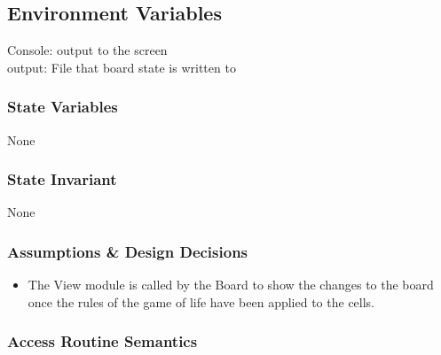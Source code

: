 \documentclass[12pt]{article}
\begin{document}
\subsection* {Environment Variables}

Console: output to the screen\\
output: File that board state is written to\\

\subsubsection* {State Variables}

None

\subsubsection* {State Invariant}

None

\subsubsection* {Assumptions \& Design Decisions}

\begin{itemize}
\item The View module is called by the Board to show the changes to the board once the rules of the game of life have been applied to the cells.
\end{itemize}

\subsubsection* {Access Routine Semantics}
\end{document}
